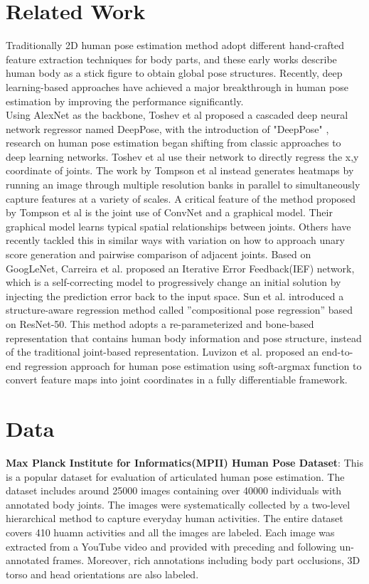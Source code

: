\documentclass[final]{cvpr}
\begin{document}
\section{Related Work}
Traditionally 2D human pose estimation method adopt different hand-crafted feature extraction techniques for body parts, and these early works describe human body as a stick figure to obtain global pose structures. Recently, deep learning-based approaches have achieved a major breakthrough in human pose estimation by improving the performance significantly.\\
\indent Using AlexNet\cite{krizhevsky2017imagenet} as the backbone, Toshev et al\cite{toshev2014deeppose} proposed a cascaded deep neural network regressor named DeepPose, with the introduction of "DeepPose" , research on human pose estimation began shifting from classic approaches to deep learning networks. Toshev et al use their network to directly regress the x,y coordinate of joints. The work by Tompson et al\cite{tompson2014joint} instead generates heatmaps by running an image through multiple resolution banks in parallel to simultaneously capture features at a variety of scales. A critical feature of the method proposed by Tompson et al\cite{tompson2014joint} is the joint use of ConvNet and a graphical model. Their graphical model learns typical spatial relationships between joints. Others have recently tackled this in similar ways\cite{pishchulin2016deepcut} with variation on how to approach unary score generation  and pairwise comparison of adjacent joints. Based on GoogLeNet\cite{szegedy2015going}, Carreira et al.\cite{carreira2016human} proposed an Iterative Error Feedback(IEF) network, which is a self-correcting model to progressively  change an initial solution by injecting the prediction error back to the input space. Sun et al.\cite{sun2017compositional} introduced a structure-aware regression method called  ”compositional  pose  regression”  based  on ResNet-50\cite{he2016deep}. This method adopts a re-parameterized and bone-based representation that contains human body information and pose structure, instead of the traditional joint-based representation. Luvizon et al.\cite{luvizon2019human} proposed an end-to-end regression approach for human pose estimation using soft-argmax function to convert feature maps into joint coordinates in a fully differentiable framework.
\section{Data}
\noindent \textbf{Max Planck Institute for Informatics(MPII) Human Pose Dataset}: This is a popular dataset for evaluation of articulated human pose estimation. The dataset includes around 25000 images containing over 40000 individuals with annotated body joints. The images were systematically collected by a two-level hierarchical method to capture everyday human activities. The entire dataset covers 410 huamn activities and all the images are labeled. Each image was extracted from a YouTube video and provided with preceding and following un-annotated frames. Moreover, rich annotations including body part occlusions, 3D torso and head orientations are also labeled.
\end{document}
